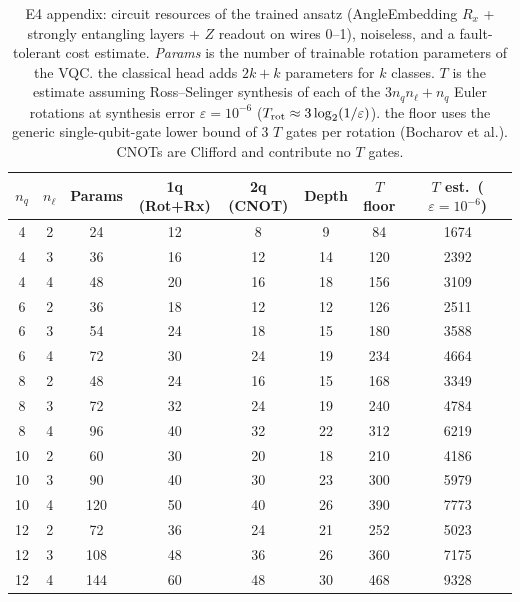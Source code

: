 \begin{table}[ht]
\centering
\small
\setlength{\tabcolsep}{4pt}
\caption{E4 appendix: circuit resources of the trained ansatz (AngleEmbedding $R_x$ + strongly entangling layers + $Z$ readout on wires 0--1), noiseless, and a fault-tolerant cost estimate. \emph{Params} is the number of trainable rotation parameters of the VQC. the classical head adds $2k+k$ parameters for $k$ classes. $T$ is the estimate assuming Ross--Selinger synthesis of each of the $3n_q n_\ell + n_q$ Euler rotations at synthesis error $\varepsilon=10^{-6}$ ($T_{\rm rot}\approx 3\log_2(1/\varepsilon)$). the floor uses the generic single-qubit-gate lower bound of 3 $T$ gates per rotation (Bocharov et al.). CNOTs are Clifford and contribute no $T$ gates.}
\label{tab:e4_resources}
\begin{tabular}{cccccccc}
\toprule
$n_q$ & $n_\ell$ & Params & 1q (Rot+Rx) & 2q (CNOT) & Depth & $T$ floor & $T$ est.\ ($\varepsilon{=}10^{-6}$) \\
\midrule
4 & 2 & 24 & 12 & 8 & 9 & 84 & 1674 \\
4 & 3 & 36 & 16 & 12 & 14 & 120 & 2392 \\
4 & 4 & 48 & 20 & 16 & 18 & 156 & 3109 \\
\midrule
6 & 2 & 36 & 18 & 12 & 12 & 126 & 2511 \\
6 & 3 & 54 & 24 & 18 & 15 & 180 & 3588 \\
6 & 4 & 72 & 30 & 24 & 19 & 234 & 4664 \\
\midrule
8 & 2 & 48 & 24 & 16 & 15 & 168 & 3349 \\
8 & 3 & 72 & 32 & 24 & 19 & 240 & 4784 \\
8 & 4 & 96 & 40 & 32 & 22 & 312 & 6219 \\
\midrule
10 & 2 & 60 & 30 & 20 & 18 & 210 & 4186 \\
10 & 3 & 90 & 40 & 30 & 23 & 300 & 5979 \\
10 & 4 & 120 & 50 & 40 & 26 & 390 & 7773 \\
\midrule
12 & 2 & 72 & 36 & 24 & 21 & 252 & 5023 \\
12 & 3 & 108 & 48 & 36 & 26 & 360 & 7175 \\
12 & 4 & 144 & 60 & 48 & 30 & 468 & 9328 \\
\bottomrule
\end{tabular}
\end{table}
